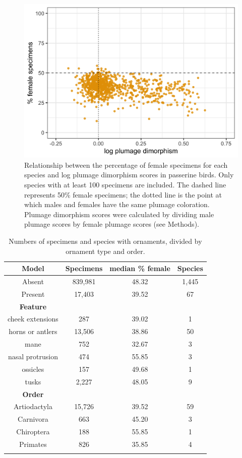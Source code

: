 \documentclass[a4paper, 12pt]{article}
\begin{document}
\begin{figure}
 \centering
  \includegraphics[width = \linewidth]{figures/plumage.png}
  \caption{Relationship between the percentage of female specimens for each species and log plumage dimorphism scores in passerine birds. 
  Only species with at least 100 specimens are included. 
  The dashed line represents 50\% female specimens; the dotted line is the point at which males and females have the same plumage coloration. 
  Plumage dimorphism scores were calculated by dividing male plumage scores by female plumage scores (see Methods). 
}
  \label{fig-plumage}
\end{figure}

\begin{table}
\begin{tabular}{cccc}

\caption{Numbers of specimens and species with ornaments, divided by ornament type and order.} 
  
  \hline
  \textbf{Model} & \textbf{Specimens} & \textbf{median \% female} & \textbf{Species}\\ 
  \hline
  Absent & 839,981 & 48.32 & 1,445\\
  Present & 17,403 & 39.52 & 67\\
  \hline
  \textbf{Feature} &&&\\
  \hline
  cheek extensions & 287 & 39.02 & 1\\
  horns or antlers & 13,506 & 38.86 & 50\\
  mane & 752 & 32.67 & 3\\
  nasal protrusion & 474 & 55.85 & 3\\
  ossicles & 157 & 49.68 & 1\\
  tusks & 2,227 & 48.05 & 9\\
  \hline
  \textbf{Order} &&&\\
  \hline
  Artiodactyla & 15,726 & 39.52 & 59\\
  Carnivora & 663 & 45.20 & 3\\
  Chiroptera & 188 & 55.85 & 1\\
  Primates & 826 & 35.85 & 4\\
  \hline

\label{table_numbers}
\end{tabular}
\end{table}
\end{document}
